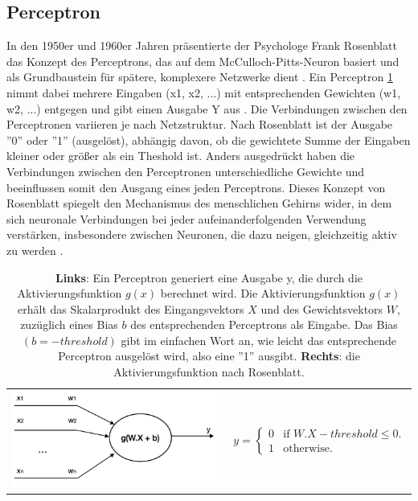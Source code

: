     \subsection{Perceptron}
    In den 1950er und 1960er Jahren präsentierte der Psychologe Frank Rosenblatt das Konzept des Perceptrons, das auf dem McCulloch-Pitts-Neuron basiert und als Grundbaustein für spätere, komplexere Netzwerke dient \cite{rosenblatt}. Ein Perceptron \ref{tab:background:Perceptron} nimmt dabei mehrere Eingaben (x1, x2, ...) mit entsprechenden Gewichten (w1, w2, ...) entgegen und gibt einen Ausgabe Y aus . Die Verbindungen zwischen den Perceptronen variieren je nach Netzstruktur. Nach Rosenblatt ist der Ausgabe ''0'' oder ''1'' (ausgelöst), abhängig davon, ob die gewichtete Summe der Eingaben kleiner oder größer als ein Theshold ist. Anders ausgedrückt haben die Verbindungen zwischen den Perceptronen unterschiedliche Gewichte und beeinflussen somit den Ausgang eines jeden Perceptrons. Dieses Konzept von Rosenblatt spiegelt den Mechanismus des menschlichen Gehirns wider, in dem sich neuronale Verbindungen bei jeder aufeinanderfolgenden Verwendung verstärken, insbesondere zwischen Neuronen, die dazu neigen, gleichzeitig aktiv zu werden \cite{organization-of-behavior-1949}.

    \begin{table}[htbp]
        \begin{tabular}{c c}
            \includegraphics[width=0.5\linewidth, height=0.25\textwidth, valign=m]{gfx/NeuralNet/Perceptron.png}
            &
            $y = \begin{cases}
                0 & \text{if } W.X - threshold \le 0. \\
                1 & \text{otherwise}.
                 \end{cases}
            $  
        \end{tabular}
        \caption[Perceptron]{\textbf{Links}: Ein Perceptron generiert eine Ausgabe y, die durch die Aktivierungsfunktion $g(x)$ berechnet wird. Die Aktivierungsfunktion $g(x)$ erhält das Skalarprodukt des Eingangsvektors $X$ und des Gewichtsvektors $W$, zuzüglich eines Bias $b$ des entsprechenden Perceptrons als Eingabe. Das Bias $(b = - threshold)$ gibt im einfachen Wort an, wie leicht das entsprechende Perceptron ausgelöst wird, also eine ''1'' ausgibt. \textbf{Rechts}: die Aktivierungsfunktion nach Rosenblatt.}
        \label{tab:background:Perceptron}
    \end{table}

